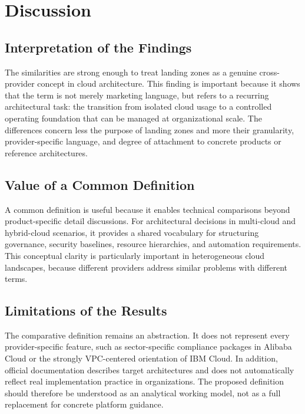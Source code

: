 \section{Discussion}
\label{sec:discussion}




\subsection{Interpretation of the Findings}

The similarities are strong enough to treat landing zones as a genuine cross-provider concept in cloud architecture. This finding is important because it shows that the term is not merely marketing language, but refers to a recurring architectural task: the transition from isolated cloud usage to a controlled operating foundation that can be managed at organizational scale. The differences concern less the purpose of landing zones and more their granularity, provider-specific language, and degree of attachment to concrete products or reference architectures.

\subsection{Value of a Common Definition}

A common definition is useful because it enables technical comparisons beyond product-specific detail discussions. For architectural decisions in multi-cloud and hybrid-cloud scenarios, it provides a shared vocabulary for structuring governance, security baselines, resource hierarchies, and automation requirements. This conceptual clarity is particularly important in heterogeneous cloud landscapes, because different providers address similar problems with different terms.

\subsection{Limitations of the Results}

The comparative definition remains an abstraction. It does not represent every provider-specific feature, such as sector-specific compliance packages in Alibaba Cloud or the strongly VPC-centered orientation of IBM Cloud. In addition, official documentation describes target architectures and does not automatically reflect real implementation practice in organizations. The proposed definition should therefore be understood as an analytical working model, not as a full replacement for concrete platform guidance.